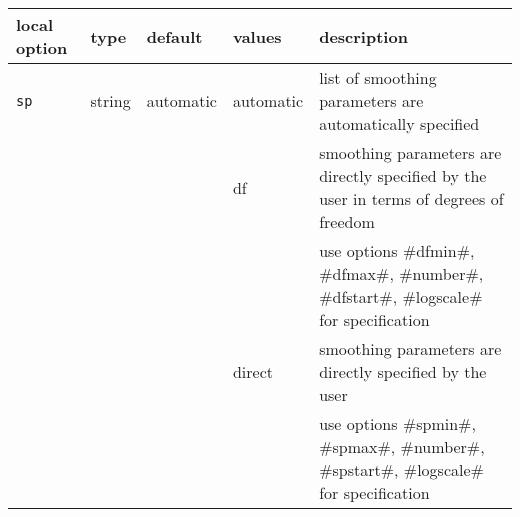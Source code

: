\begin{sidewaystable}[ht] \footnotesize
 \begin{center}
 \begin{tabular}{|l|l|l|l|l|}%
 \hline
 {\bf local option} & {\bf type} & {\bf default} & {\bf values} & {\bf description} \\
 \hline \hline
 {\tt sp}        & string                 & automatic & automatic & list of smoothing parameters are automatically specified  \\
                 &                         &       & df  & smoothing parameters are directly specified by the user in terms of  degrees of freedom \\
                 &                         &       &   & use options #dfmin#, #dfmax#, #number#, #dfstart#, #logscale# for specification  \\
                 &                         &       & direct  & smoothing parameters are directly specified by the user  \\
                 &                         &       &   & use options #spmin#, #spmax#, #number#, #spstart#, #logscale# for specification  \\


\end{tabular}
\end{center}
\end{sidewaystable}
